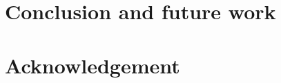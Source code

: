 \documentclass{sig-alternate}
\begin{document}
 
  


\section{Conclusion and future work}
\label{sec:concfut}

\section{Acknowledgement}

%

%
%
\end{document}

